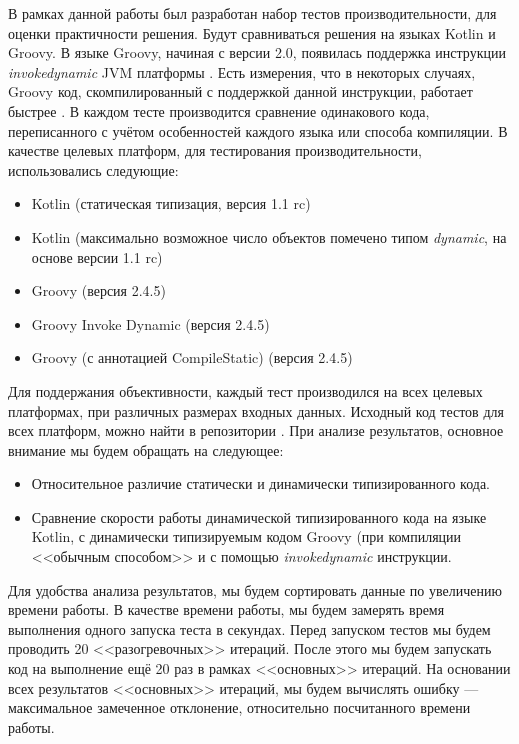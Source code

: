 В рамках данной работы был разработан набор тестов производительности, для оценки практичности решения. Будут сравниваться решения на языках Kotlin и Groovy. В языке Groovy, начиная с версии 2.0, появилась поддержка инструкции \textit{invokedynamic} JVM платформы \cite{groovy:invokeDynamicSupport}. Есть измерения, что в некоторых случаях, Groovy код, скомпилированный с поддержкой данной инструкции, работает быстрее \cite{groovy:indyTest1}.
В каждом тесте производится сравнение одинакового кода, переписанного с учётом особенностей каждого языка или способа компиляции. В качестве целевых платформ, для тестирования производительности, использовались следующие:

\begin{itemize}
    \item Kotlin (статическая типизация, версия 1.1 rc) 
    \item Kotlin (максимально возможное число объектов помечено типом \textit{dynamic}, на основе версии 1.1 rc)
    \item Groovy (версия 2.4.5)
    \item Groovy Invoke Dynamic (версия 2.4.5)
    \item Groovy (с аннотацией CompileStatic) (версия 2.4.5)
\end{itemize}


Для поддержания объективности, каждый тест производился на всех целевых платформах, при различных размерах входных данных. Исходный код тестов для всех платформ, можно найти в репозитории \cite{github:myBenchs}. При анализе результатов, основное внимание мы будем обращать на следующее:

\begin{itemize}
    \item Относительное различие статически и динамически типизированного кода.
    \item Сравнение скорости работы динамической типизированного кода на языке Kotlin, с динамически типизируемым кодом Groovy (при компиляции <<обычным способом>> и с помощью \textit{invokedynamic} инструкции.
\end{itemize}

Для удобства анализа результатов, мы будем сортировать данные по увеличению времени работы. В качестве времени работы, мы будем замерять время выполнения одного запуска теста в секундах. Перед запуском тестов мы будем проводить 20 <<разогревочных>> итераций. После этого мы будем запускать код на выполнение ещё 20 раз в рамках <<основных>> итераций. На основании всех результатов <<основных>> итераций, мы будем вычислять ошибку --- максимальное замеченное отклонение, относительно посчитанного времени работы.


